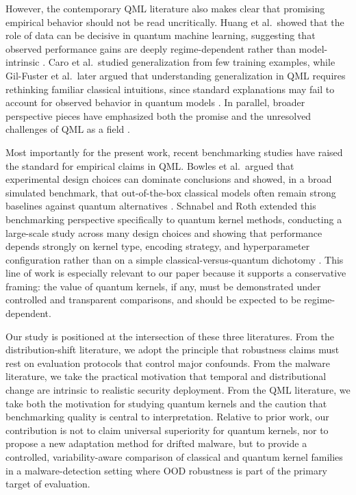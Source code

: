 \documentclass[pdflatex,sn-mathphys-num]{sn-jnl}%
\theoremstyle{thmstyleone}%
\theoremstyle{thmstyletwo}%
\theoremstyle{thmstylethree}%
\begin{document}
However, the contemporary QML literature also makes clear that promising empirical behavior should not be read uncritically. Huang et al.\ showed that the role of data can be decisive in quantum machine learning, suggesting that observed performance gains are deeply regime-dependent rather than model-intrinsic \cite{huang2021powerofdata}. Caro et al.\ studied generalization from few training examples, while Gil-Fuster et al.\ later argued that understanding generalization in QML requires rethinking familiar classical intuitions, since standard explanations may fail to account for observed behavior in quantum models \cite{caro2022generalization,gilfuster2024rethinkinggeneralization}. In parallel, broader perspective pieces have emphasized both the promise and the unresolved challenges of QML as a field \cite{cerezo2022qmlchallenges}.

Most importantly for the present work, recent benchmarking studies have raised the standard for empirical claims in QML. Bowles et al.\ argued that experimental design choices can dominate conclusions and showed, in a broad simulated benchmark, that out-of-the-box classical models often remain strong baselines against quantum alternatives \cite{bowles2024betterthanclassical}. Schnabel and Roth extended this benchmarking perspective specifically to quantum kernel methods, conducting a large-scale study across many design choices and showing that performance depends strongly on kernel type, encoding strategy, and hyperparameter configuration rather than on a simple classical-versus-quantum dichotomy \cite{schnabel2025scrutiny}. This line of work is especially relevant to our paper because it supports a conservative framing: the value of quantum kernels, if any, must be demonstrated under controlled and transparent comparisons, and should be expected to be regime-dependent.

Our study is positioned at the intersection of these three literatures. From the distribution-shift literature, we adopt the principle that robustness claims must rest on evaluation protocols that control major confounds. From the malware literature, we take the practical motivation that temporal and distributional change are intrinsic to realistic security deployment. From the QML literature, we take both the motivation for studying quantum kernels and the caution that benchmarking quality is central to interpretation. Relative to prior work, our contribution is not to claim universal superiority for quantum kernels, nor to propose a new adaptation method for drifted malware, but to provide a controlled, variability-aware comparison of classical and quantum kernel families in a malware-detection setting where OOD robustness is part of the primary target of evaluation.
\end{document}
